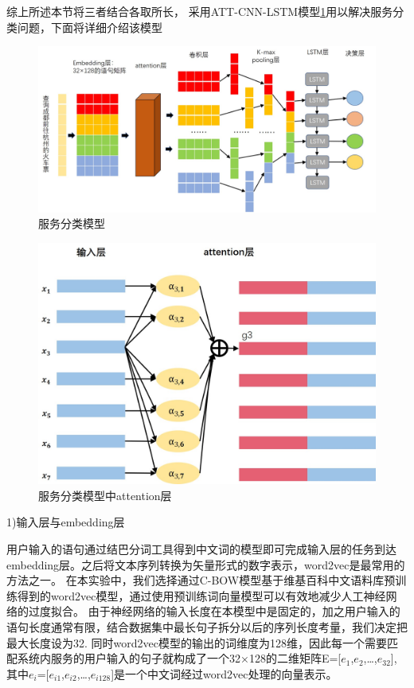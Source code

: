 综上所述本节将三者结合各取所长， 采用ATT-CNN-LSTM模型\ref{fig:cnn-lstm}用以解决服务分类问题，下面将详细介绍该模型

\begin{figure}[htbp]
    \centering
    \includegraphics[scale=0.5]{./images/cnn-lstm.jpg}
    \caption{服务分类模型}
    \label{fig:cnn-lstm}
  \end{figure}


  \begin{figure}[htbp]
    \centering
    \includegraphics[scale=0.4]{./images/attcnn.jpg}
    \caption{服务分类模型中attention层}
    \label{fig:att-cnn}
  \end{figure}


  1)输入层与embedding层

  用户输入的语句通过结巴分词工具得到中文词的模型即可完成输入层的任务到达embedding层。之后将文本序列转换为矢量形式的数字表示，word2vec是最常用的方法之一。
  在本实验中，我们选择通过C-BOW模型基于维基百科中文语料库预训练得到的word2vec模型，通过使用预训练词向量模型可以有效地减少人工神经网络的过度拟合。
  由于神经网络的输入长度在本模型中是固定的，加之用户输入的语句长度通常有限，结合数据集中最长句子拆分以后的序列长度考量，我们决定把最大长度设为32.
  同时word2vec模型的输出的词维度为128维，因此每一个需要匹配系统内服务的用户输入的句子就构成了一个32×128的二维矩阵E=[$e_{1}$,$e_{2}$,\dots,$e_{32}$],
  其中$e_{i}$=[$e_{i1}$,$e_{i2}$,\dots,$e_{i128}$]是一个中文词经过word2vec处理的向量表示。

